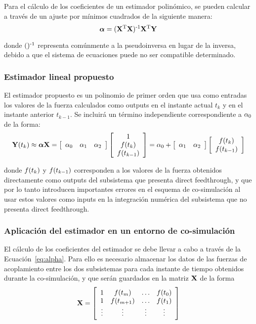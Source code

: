 Para el cálculo de los coeficientes de un estimador polinómico, se pueden calcular a través de un ajuste por mínimos cuadrados de la siguiente manera:
%
\begin{equation}
    \coefficients = (\estimation\trans \estimation)\inv \estimation\trans \estimated
    \label{eq:alpha}
\end{equation}

donde $()\inv$ representa comúnmente a la pseudoinversa en lugar de la inversa, debido a que el sistema de ecuaciones puede no ser compatible determinado.

\subsubsection{Estimador lineal propuesto}

El estimador propuesto es un polinomio de primer orden que usa como entradas los valores de la fuerza calculados como outputs en el instante actual $t_k$ y en el instante anterior $t_{k-1}$. Se incluirá un término independiente correspondiente a $\coefficient_0$ de la forma:
%
\begin{equation}
    \estimated (t_k) \approx \coefficients \estimation = \sqbr{\hvect{ccc}{\coefficient_0 & \coefficient_1 & \coefficient_2}} \sqbr{\cvvect{1 \\ \forceMod (t_k) \\ \forceMod (t_{k-1})}} = \coefficient_0 + \sqbr{\hvect{cc}{\coefficient_1 & \coefficient_2}} \sqbr{\cvvect{\forceMod (t_k) \\ \forceMod (t_{k-1})}}
\end{equation}

donde $\forceMod (t_k)$ y $\forceMod (t_{k-1})$ corresponden a los valores de la fuerza obtenidos directamente como outputs del subsistema que presenta direct feedthrough, y que por lo tanto introducen importantes errores en el esquema de co-simulación al usar estos valores como inputs en la integración numérica del subsistema que no presenta direct feedthrough.


\subsubsection{Aplicación del estimador en un entorno de co-simulación}

El cálculo de los coeficientes del estimador se debe llevar a cabo a través de la Ecuación~\eqref{eq:alpha}. Para ello es necesario almacenar los datos de las fuerzas de acoplamiento entre los dos subsistemas para cada instante de tiempo obtenidos durante la co-simulación, y que serán guardados en la matriz $\estimation$ de la forma
%
\begin{equation}
    \estimation = \sqbr{\matr{cccc}
    {1 & \forceMod (t_m) & \dots &\forceMod (t_0) \\
    1 & \forceMod (t_{m+1}) & \dots & \forceMod (t_1) \\
    \vdots & \vdots & \vdots &\vdots}} 
\end{equation}

